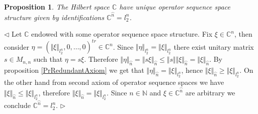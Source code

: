 \documentclass[12pt]{article}
\newtheorem{proposition}[theorem]{Proposition}
\newenvironment{proof}{\par $\triangleleft$}{$\triangleright$}
\begin{document}
\begin{proposition}\label{PrCHaveUniqueOSS} The Hilbert space $\mathbb{C}$ have unique operator sequence space structure given by identifications $\mathbb{C}^{\wideparen{n}}=l_2^n$.
\end{proposition}
\begin{proof} Let $\mathbb{C}$ endowed with some operator sequence space structure. Fix $\xi\in\mathbb{C}^n$, then consider $\eta=(\Vert \xi\Vert_{l_2^n},0,\ldots,0)^{tr}\in \mathbb{C}^n$. Since $\Vert\eta\Vert_{l_2^n}=\Vert\xi\Vert_{l_2^n}$  there exist unitary matrix $s\in M_{n,n}$ such that $\eta=s\xi$. Therefore $\Vert\eta\Vert_{\wideparen{n}}=\Vert s\xi\Vert_{\wideparen{n}}\leq\Vert s\Vert\Vert\xi\Vert_{\wideparen{n}}=\Vert\xi\Vert_{\wideparen{n}}$. By proposition \ref{PrRedundantAxiom} we get that $\Vert\eta\Vert_{\wideparen{n}}=\Vert \xi\Vert_{l_2^n}$, hence $\Vert\xi\Vert_{\wideparen{n}}\geq\Vert\xi\Vert_{l_2^n}$. On the other hand from second axiom of operator sequence spaces we have 
$\Vert \xi\Vert_{\wideparen{n}}\leq\Vert\xi\Vert_{l_2^n}$, therefore $\Vert \xi\Vert_{\wideparen{n}}=\Vert \xi\Vert_{l_2^n}$. Since $n\in\mathbb{N}$ and $\xi\in \mathbb{C}^{\wideparen{n}}$ are arbitrary we conclude $\mathbb{C}^{\wideparen{n}}=l_2^n$.
\end{proof}
\end{document}
